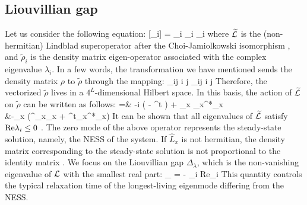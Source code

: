 \subsection{Liouvillian gap}
\label{subsec_liouvilliangap}

Let us consider the following equation:
	[\widetilde \rho_i] = \lambda_i \widetilde \rho_i \cm
	\qquad \lambda_i \in {} \pc
\ea
where $\widetilde {\cal L}$ is the (non-hermitian) Lindblad superoperator after the 
Choi-Jamiolkowski isomorphism 
\cite{BP-openquantumsystembook, VZ-2004-superoperatorvidal}, and $\widetilde \rho_i$ is the
density matrix eigen-operator associated with the complex eigenvalue $\lambda_i$.
In a few words, the transformation we have mentioned sends the density matrix $\rho$ to 
$\widetilde \rho$ through the mapping:
	\rho_{ij} \ket i \bra j  \longrightarrow  \widetilde \rho_{ij} \ket i \ket j \pt
\ee
Therefore, the vectorized $\widetilde \rho$ lives in a $4^L$-dimensional Hilbert space.
In this basis, the action of $\widetilde{\cal L}$ on 
$\widetilde \rho$ can be written as follows:
	 =& -i \big( \otimes {} 
		- \otimes {}^t \big) + 
		\gamma\sum_{x }_{x}\otimes {}^*_{x}\\
	&-\sum_{x }\big(^{\dagger}_{x}_{x}
		\otimes{}+
			\otimes\hat{L}^t_{x}^*_{x}\big) \pt
\ea
It can be shown that all eigenvalues of $\widetilde{\cal L}$ satisfy 
$ {\rm Re}{\lambda_i } \le 0$ \cite{BP-openquantumsystembook}. The zero mode of the above 
operator represents the steady-state solution, namely, the NESS of the system. 
If $\hat L_x$ is not hermitian, the density matrix corresponding to the steady-state 
solution is not proportional to the identity matrix \cite{KS-2020-boundarydephasing}. 
We focus on the Liouvillian gap $\Delta_{\lambda}$, which is the non-vanishing eigenvalue
of ${\cal L}$ with the smallest real part:
\Delta_{\lambda} = - \max_{i} {\rm Re}{\lambda_i } \pt
\ea
This quantity controls the typical relaxation time of the longest-living 
eigenmode differing from the NESS.
